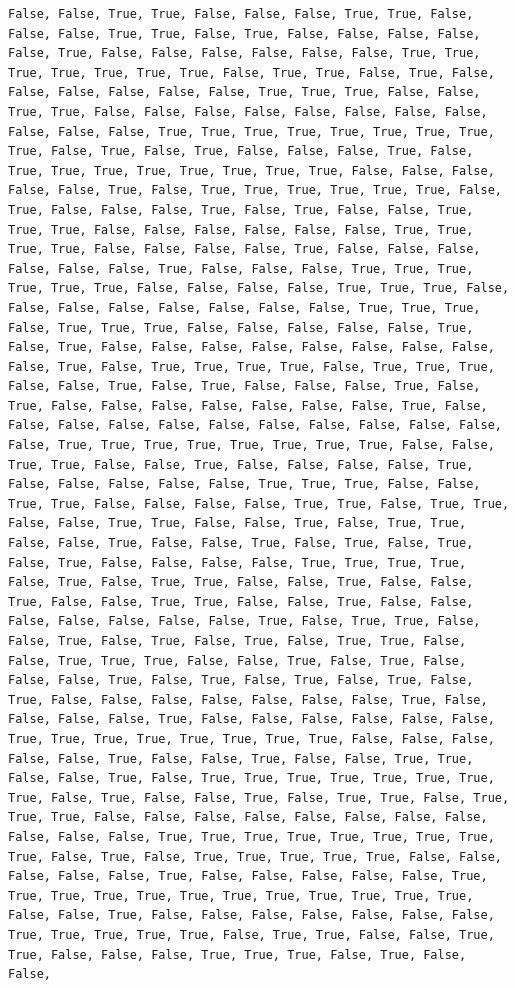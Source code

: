 \documentclass[
  letterpaper,
  DIV=11,
  numbers=noendperiod]{scrartcl}
\begin{document}
\begin{verbatim}
False, False, True, True, False, False, False, True, True, False, False, False, True, True, False, True, False, False, False, False, False, True, False, False, False, False, False, False, True, True, True, True, True, True, True, False, True, True, False, True, False, False, False, False, False, False, True, True, True, False, False, True, True, False, False, False, False, False, False, False, False, False, False, False, True, True, True, True, True, True, True, True, True, False, True, False, True, False, False, False, True, False, True, True, True, True, True, True, True, True, False, False, False, False, False, True, False, True, True, True, True, True, True, False, True, False, False, False, True, False, True, False, False, True, True, True, False, False, False, False, False, False, True, True, True, True, False, False, False, False, True, False, False, False, False, False, False, True, False, False, False, True, True, True, True, True, True, False, False, False, False, True, True, True, False, False, False, False, False, False, False, False, True, True, True, False, True, True, True, False, False, False, False, False, True, False, True, False, False, False, False, False, False, False, False, False, True, False, True, True, True, True, False, True, True, True, False, False, True, False, True, False, False, False, True, False, True, False, False, False, False, False, False, False, True, False, False, False, False, False, False, False, False, False, False, False, False, True, True, True, True, True, True, True, True, False, False, True, True, False, False, True, False, False, False, False, True, False, False, False, False, False, True, True, True, False, False, True, True, False, False, False, False, True, True, False, True, True, False, False, True, True, False, False, True, False, True, True, False, False, True, False, False, True, False, True, False, True, False, True, False, False, False, False, True, True, True, True, False, True, False, True, True, False, False, True, False, False, True, False, False, True, True, False, False, True, False, False, False, False, False, False, False, True, False, True, True, False, False, True, False, True, False, True, False, True, True, False, False, True, True, True, False, False, True, False, True, False, False, False, True, False, True, False, True, False, True, False, True, False, False, False, False, False, False, False, True, False, False, False, False, True, False, False, False, False, False, False, True, True, True, True, True, True, True, True, False, False, False, False, False, True, False, False, True, False, False, True, True, False, False, True, False, True, True, True, True, True, True, True, True, False, True, False, False, True, False, True, True, False, True, True, True, False, False, False, False, False, False, False, False, False, False, False, True, True, True, True, True, True, True, True, True, False, True, False, True, True, True, True, True, False, False, False, False, False, True, False, False, False, False, False, True, True, True, True, True, True, True, True, True, True, True, True, False, False, True, False, False, False, False, False, False, False, True, True, True, True, True, False, True, True, False, False, True, True, False, False, False, True, True, True, False, True, False, False, 
\end{verbatim}
\end{document}
